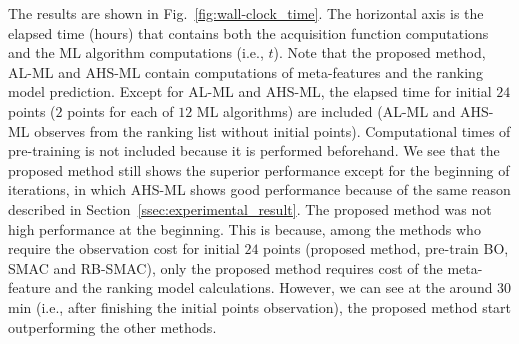 The results are shown in Fig.~\ref{fig:wall-clock_time}.
%
The horizontal axis is the elapsed time (hours) that contains both the acquisition function computations and the ML algorithm computations (i.e., $t$).
%
Note that the proposed method, AL-ML and AHS-ML contain computations of meta-features and the ranking model prediction.
%
Except for AL-ML and AHS-ML, the elapsed time for initial $24$ points ($2$ points for each of $12$ ML algorithms) are included (AL-ML and AHS-ML observes from the ranking list without initial points). 
%
Computational times of pre-training is not included because it is performed beforehand.
%
We see that the proposed method still shows the superior performance except for the beginning of iterations, in which AHS-ML shows good performance because of the same reason described in Section~\ref{ssec:experimental_result}. 
%
The proposed method was not high performance at the beginning.
%
This is because, among the methods who require the observation cost for initial $24$ points (proposed method, pre-train BO, SMAC and RB-SMAC), only the proposed method requires cost of the meta-feature and the ranking model calculations.
%
However, we can see at the around 30 min (i.e., after finishing the initial points observation), the proposed method start outperforming the other methods.



